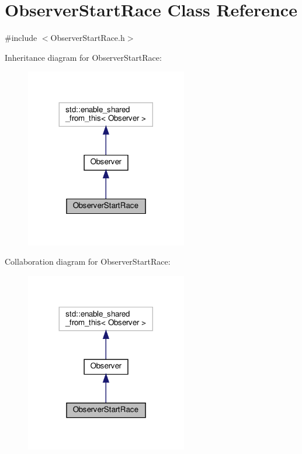 \hypertarget{classObserverStartRace}{}\section{Observer\+Start\+Race Class Reference}
\label{classObserverStartRace}


{\ttfamily \#include $<$Observer\+Start\+Race.\+h$>$}



Inheritance diagram for Observer\+Start\+Race\+:\nopagebreak
\begin{figure}[H]
\begin{center}
\leavevmode
\includegraphics[width=200pt]{classObserverStartRace__inherit__graph}
\end{center}
\end{figure}


Collaboration diagram for Observer\+Start\+Race\+:\nopagebreak
\begin{figure}[H]
\begin{center}
\leavevmode
\includegraphics[width=200pt]{classObserverStartRace__coll__graph}
\end{center}
\end{figure}
